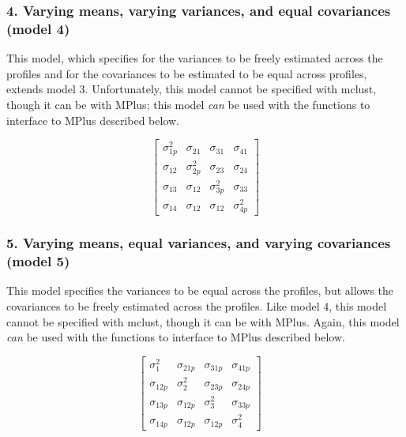 \documentclass[]{book}
\theoremstyle{definition}
\theoremstyle{definition}
\theoremstyle{definition}
\theoremstyle{remark}
\begin{document}
\subsubsection{4. Varying means, varying variances, and equal
covariances (model
4)}\label{varying-means-varying-variances-and-equal-covariances-model-4}

This model, which specifies for the variances to be freely estimated
across the profiles and for the covariances to be estimated to be equal
across profiles, extends model 3. Unfortunately, this model cannot be
specified with mclust, though it can be with MPlus; this model
\emph{can} be used with the functions to interface to MPlus described
below.

\[
\left[ \begin{matrix} { \sigma  }_{ 1p }^{ 2 } & { \sigma  }_{ 21 } & { \sigma  }_{ 31 } & { \sigma  }_{ 41 } \\ { \sigma  }_{ 12 } & { \sigma  }_{ 2p }^{ 2 } & { \sigma  }_{ 23 } & { \sigma  }_{ 24 } \\ { \sigma  }_{ 13 } & { \sigma  }_{ 12 } & { \sigma  }_{ 3p }^{ 2 } & { \sigma  }_{ 33 } \\ { \sigma  }_{ 14 } & { \sigma  }_{ 12 } & { \sigma  }_{ 12 } & { \sigma  }_{ 4p }^{ 2 } \end{matrix} \right] 
\]

\subsubsection{5. Varying means, equal variances, and varying
covariances (model
5)}\label{varying-means-equal-variances-and-varying-covariances-model-5}

This model specifies the variances to be equal across the profiles, but
allows the covariances to be freely estimated across the profiles. Like
model 4, this model cannot be specified with mclust, though it can be
with MPlus. Again, this model \emph{can} be used with the functions to
interface to MPlus described below.

\[
\left[ \begin{matrix} { \sigma  }_{ 1 }^{ 2 } & { \sigma  }_{ 21p } & { \sigma  }_{ 31p } & { \sigma  }_{ 41p } \\ { \sigma  }_{ 12p } & { \sigma  }_{ 2 }^{ 2 } & { \sigma  }_{ 23p } & { \sigma  }_{ 24p } \\ { \sigma  }_{ 13p } & { \sigma  }_{ 12p } & { \sigma  }_{ 3 }^{ 2 } & { \sigma  }_{ 33p } \\ { \sigma  }_{ 14p } & { \sigma  }_{ 12p } & { \sigma  }_{ 12p } & { \sigma  }_{ 4 }^{ 2 } \end{matrix} \right] \quad 
\]
\end{document}
